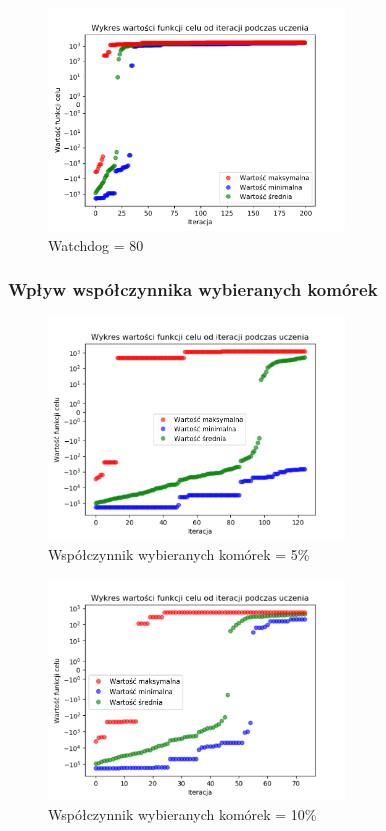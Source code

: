 \documentclass[a4paper]{article}
\begin{document}
\begin{figure}[H]
    \centering
    \includegraphics[width=0.7\textwidth]{plots/watchdog_80.pdf}
    \caption{Watchdog = 80}
    \label{fig:watchdog_80}
\end{figure}


\subsubsection{Wpływ współczynnika wybieranych komórek}
\begin{figure}[H]
    \centering
    \includegraphics[width=0.7\textwidth]{plots/selection_05.pdf}
    \caption{Współczynnik wybieranych komórek = 5\%}
    \label{fig:selection_05}
\end{figure}

\begin{figure}[H]
    \centering
    \includegraphics[width=0.7\textwidth]{plots/selection_10.pdf}
    \caption{Współczynnik wybieranych komórek = 10\%}
    \label{fig:selection_10}
\end{figure}
\end{document}
